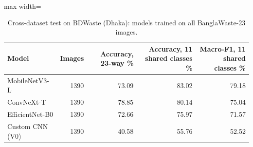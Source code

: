 \begin{table}[!htbp]
\centering
\scriptsize
\caption{Cross-dataset test on BDWaste (Dhaka): models trained on all BanglaWaste-23 images.}
\label{tab:s_bdwaste}
\begin{adjustbox}{max width=\textwidth}
\begin{tabular}{@{}lrrrr@{}}
\toprule
Model & Images & Accuracy, 23-way \% & Accuracy, 11 shared classes \% & Macro-F1, 11 shared classes \% \\
\midrule
MobileNetV3-L & 1390 & 73.09 & 83.02 & 79.18 \\
ConvNeXt-T & 1390 & 78.85 & 80.14 & 75.04 \\
EfficientNet-B0 & 1390 & 72.66 & 75.97 & 71.57 \\
Custom CNN (V0) & 1390 & 40.58 & 55.76 & 52.52 \\
\bottomrule
\end{tabular}
\end{adjustbox}
\end{table}
